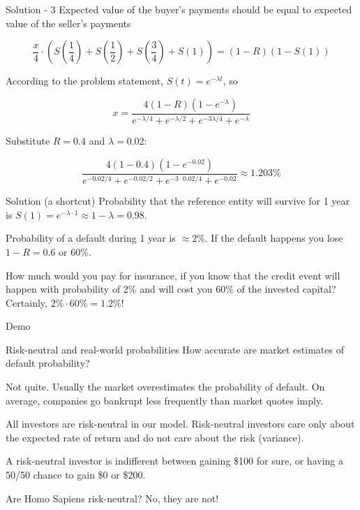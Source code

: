 \documentclass{beamer}
\begin{document}
\begin{frame}{Solution - 3}
\justify
Expected value of the buyer's payments should be equal to expected value of the seller's payments

\begin{equation*}
\frac{x}{4} \cdot \left( S\left(\frac{1}{4}\right) + S\left(\frac{1}{2}\right) + S\left(\frac{3}{4}\right) +S\left(1\right) \right) = (1 - R)(1 - S(1))
\end{equation*}

According to the problem statement, $S(t)=e^{-\lambda t}$, so

\begin{equation*}
x = \frac{4(1 - R)(1 - e^{-\lambda})}{e^{-\lambda / 4} + e^{-\lambda / 2} + e^{-3\lambda / 4} + e^{-\lambda}}
\end{equation*}

Substitute $R = 0.4$ and $\lambda = 0.02$:

\begin{equation*}
\frac{4(1 - 0.4)(1 - e^{-0.02})}{e^{-0.02 / 4} + e^{-0.02 / 2} + e^{-3\cdot0.02 / 4} + e^{-0.02}} \approx 1.203\%
\end{equation*}
\end{frame}



\begin{frame}{Solution (a shortcut)}
\justify
Probability that the reference entity will survive for 1 year is $S(1) = e^{-\lambda \cdot 1} \approx 1 - \lambda = 0.98$.

\justify
Probability of a default during 1 year is $\approx 2\%$. If the default happens you lose $1 - R = 0.6$ or $60\%$.

\justify
How much would you pay for insurance, if you know that the credit event will happen with probability of 2\% and will cost you 60\% of the invested capital? Certainly, $2\% \cdot 60\% = 1.2\%$! 
\end{frame}



\begin{frame}{Demo}
\end{frame}



\begin{frame}{Risk-neutral and real-world probabilities}
\justify
How accurate are market estimates of default probability?

\justify
Not quite. Usually the market overestimates the probability of default. On average, companies go bankrupt less frequently than market quotes imply.

\justify
All investors are \alert{risk-neutral} in our model. Risk-neutral investors care only about the expected rate of return and do not care about the risk (variance).

\justify
A risk-neutral investor is indifferent between gaining \$100 for sure, or having a 50/50 chance to gain \$0 or \$200.

\justify
Are Homo Sapiens risk-neutral? No, they are not!
\end{frame}
\end{document}
